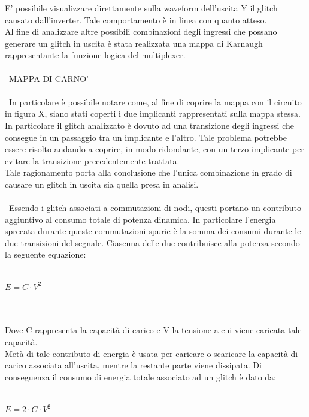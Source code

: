 \documentclass[10pt,  english, makeidx, a4paper, titlepage, oneside]{book}
\begin{document}
\newpage
E' possibile visualizzare direttamente sulla waveform dell'uscita Y
il glitch causato dall'inverter. Tale comportamento è in linea con 
quanto atteso.
\\
Al fine di analizzare altre possibili combinazioni degli ingressi
che possano generare un glitch in uscita è stata realizzata una 
mappa di Karnaugh rappresentante la funzione logica del multiplexer.
\\\\\
MAPPA DI CARNO'
\\\\\
In particolare è possibile notare come, al fine di coprire la mappa
con il circuito in figura X, siano stati coperti i due implicanti
rappresentati sulla mappa stessa. In particolare il glitch analizzato
è dovuto ad una transizione degli ingressi che consegue in un passaggio
tra un implicante e l'altro. Tale problema potrebbe essere risolto
andando a coprire, in modo ridondante, con un terzo implicante per evitare
la transizione precedentemente trattata. 
\\
Tale ragionamento porta alla conclusione che l'unica combinazione in grado
di causare un glitch in uscita sia quella presa in analisi.
\\\\\
Essendo i glitch associati a commutazioni di nodi, questi portano un 
contributo aggiuntivo al consumo totale di potenza dinamica. In particolare
l'energia sprecata durante queste commutazioni spurie è la somma dei consumi
durante le due transizioni del segnale. Ciascuna delle due contribuisce alla
potenza secondo la seguente equazione:
\\\\
\centerline{$E = C \cdot V^{2}$}
\\\\
Dove C rappresenta la capacità di carico e V la tensione a cui viene caricata
tale capacità.
\\
Metà di tale contributo di energia è usata per caricare o scaricare la
capacità di carico associata all'uscita, mentre la restante parte viene
dissipata.
Di conseguenza il consumo di energia totale associato ad un glitch è 
dato da:
\\\\
\centerline{$E = 2 \cdot C \cdot V^{2}$}
\\\\
\end{document}
